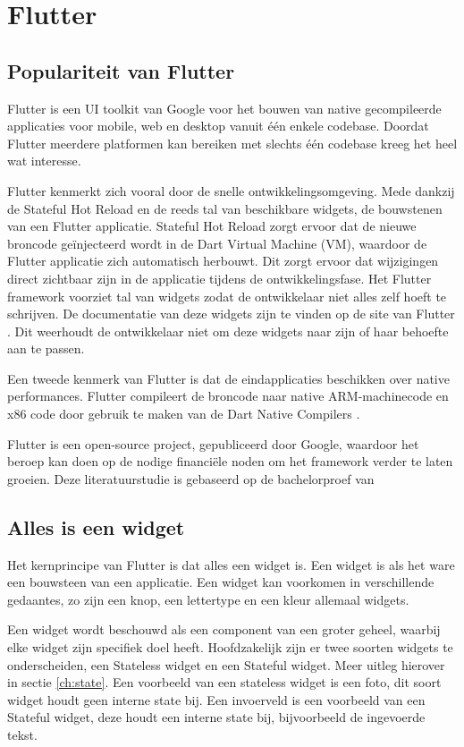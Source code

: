 \section{Flutter}
\subsection{Populariteit van Flutter}
Flutter is een UI toolkit van Google voor het bouwen van native gecompileerde applicaties voor mobile, web en desktop vanuit één enkele codebase. Doordat Flutter meerdere platformen kan bereiken met slechts één codebase kreeg het heel wat interesse. 

Flutter kenmerkt zich vooral door de snelle ontwikkelingsomgeving. Mede dankzij de Stateful Hot Reload en de reeds tal van beschikbare widgets, de bouwstenen van een Flutter applicatie. Stateful Hot Reload zorgt ervoor dat de nieuwe broncode geïnjecteerd wordt in de Dart Virtual Machine (VM), waardoor de Flutter applicatie zich automatisch herbouwt. Dit zorgt ervoor dat wijzigingen direct zichtbaar zijn in de applicatie tijdens de ontwikkelingsfase. Het Flutter framework voorziet tal van widgets zodat de ontwikkelaar niet alles zelf hoeft te schrijven. De documentatie van deze widgets zijn te vinden op de site van Flutter \autocite{Flutter2019}. Dit weerhoudt de ontwikkelaar niet om deze widgets naar zijn of haar behoefte aan te passen.

Een tweede kenmerk van Flutter is dat de eindapplicaties beschikken over native performances. Flutter compileert de broncode naar native ARM-machinecode en x86 code door gebruik te maken van de Dart Native Compilers \autocite{Dart2019}.

Flutter is een open-source project, gepubliceerd door Google, waardoor het beroep kan doen op de nodige financiële noden om het framework verder te laten groeien. 
Deze literatuurstudie is gebaseerd op de bachelorproef van \autocite{DeConinck2019}

\subsection{Alles is een widget}
\label{ch:alles-is-een-widget}
Het kernprincipe van Flutter is dat alles een widget is. Een widget is als het ware een bouwsteen van een applicatie. Een widget kan voorkomen in verschillende gedaantes, zo zijn een knop, een lettertype en een kleur allemaal widgets. 

Een widget wordt beschouwd als een component van een groter geheel, waarbij elke widget zijn specifiek doel heeft.
Hoofdzakelijk zijn er twee soorten widgets te onderscheiden, een Stateless widget en een Stateful widget. Meer uitleg hierover in sectie \ref{ch:state}. Een voorbeeld van een stateless widget is een foto, dit soort widget houdt geen interne state bij. Een invoerveld is een voorbeeld van een Stateful widget, deze houdt een interne state bij, bijvoorbeeld de ingevoerde tekst. 
\newline

